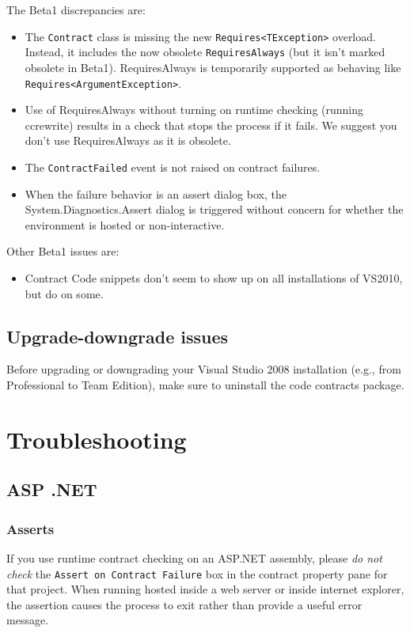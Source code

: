 \documentclass{article}
\newcommand{\code}[1]{\lstinline{#1}}
\begin{document}
The Beta1 discrepancies are:
\begin{itemize}
\item The \code{Contract} class is missing the new
  \code{Requires<TException>} overload. Instead, it includes the now
  obsolete \code{RequiresAlways} (but it isn't marked obsolete in Beta1).
  RequiresAlways is temporarily supported as behaving
  like \code{Requires<ArgumentException>}.

\item Use of RequiresAlways without turning on runtime checking
  (running ccrewrite) results in a check that stops the process if it
  fails. We suggest you don't use RequiresAlways as it is obsolete.

\item The \code{ContractFailed} event is not raised on
contract failures.

\item When the failure behavior is an
assert dialog box, the System.Diagnostics.Assert dialog is triggered
without concern for whether the environment is hosted or
non-interactive.

\end{itemize}
Other Beta1 issues are:
\begin{itemize}
\item Contract Code snippets don't seem to show up on all
  installations of VS2010, but do on some.
\end{itemize}

\subsection{Upgrade-downgrade issues}
Before upgrading or downgrading your Visual Studio 2008 installation
(e.g., from Professional to Team Edition), make sure to uninstall the
code contracts package.

\section{Troubleshooting}

\subsection{ASP .NET}
\subsubsection{Asserts}
If you use runtime contract checking on an ASP.NET assembly, please
\emph{do not check} the \code{Assert on Contract Failure} box in the
contract property pane for that project. When running hosted inside a web
server or inside internet explorer, the assertion causes the process
to exit rather than provide a useful error message.
\end{document}
